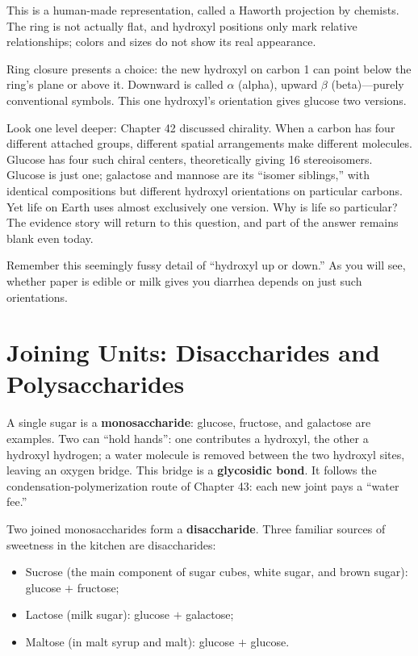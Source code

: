 This is a human-made representation, called a Haworth projection by chemists. The ring is not actually flat, and hydroxyl positions only mark relative relationships; colors and sizes do not show its real appearance.

Ring closure presents a choice: the new hydroxyl on carbon 1 can point below the ring's plane or above it. Downward is called $\alpha$ (alpha), upward $\beta$ (beta)---purely conventional symbols. This one hydroxyl's orientation gives glucose two versions.

Look one level deeper: Chapter 42 discussed chirality. When a carbon has four different attached groups, different spatial arrangements make different molecules. Glucose has four such chiral centers, theoretically giving 16 stereoisomers. Glucose is just one; galactose and mannose are its ``isomer siblings,'' with identical compositions but different hydroxyl orientations on particular carbons. Yet life on Earth uses almost exclusively one version. Why is life so particular? The evidence story will return to this question, and part of the answer remains blank even today.

Remember this seemingly fussy detail of ``hydroxyl up or down.'' As you will see, whether paper is edible or milk gives you diarrhea depends on just such orientations.

\section{Joining Units: Disaccharides and Polysaccharides}

A single sugar is a \textbf{monosaccharide}: glucose, fructose, and galactose are examples. Two can ``hold hands'': one contributes a hydroxyl, the other a hydroxyl hydrogen; a water molecule is removed between the two hydroxyl sites, leaving an oxygen bridge. This  bridge is a \textbf{glycosidic bond}. It follows the condensation-polymerization route of Chapter 43: each new joint pays a ``water fee.''

Two joined monosaccharides form a \textbf{disaccharide}. Three familiar sources of sweetness in the kitchen are disaccharides:

\begin{itemize}[itemsep=2pt]
\item Sucrose (the main component of sugar cubes, white sugar, and brown sugar): glucose $+$ fructose;
\item Lactose (milk sugar): glucose $+$ galactose;
\item Maltose (in malt syrup and malt): glucose $+$ glucose.
\end{itemize}

